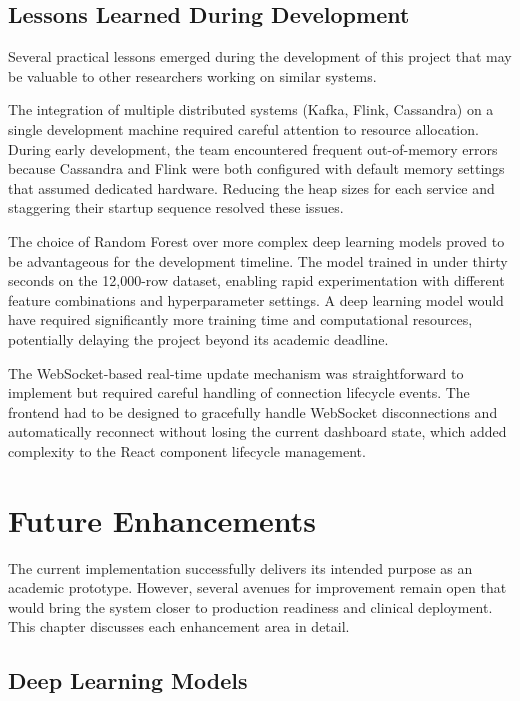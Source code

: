\documentclass[12pt, a4paper, oneside]{report}
\newcommand{\chapterpage}[2]{%
    \cleardoublepage
    \thispagestyle{empty}
    \vspace*{\fill}
    \begin{center}
        \huge \textbf{Chapter #1} \\
        \vspace{1cm}
        \Huge #2
    \end{center}
    \vspace*{\fill}
    \newpage
}
\begin{document}
\section{Lessons Learned During Development}

Several practical lessons emerged during the development of this project that may be valuable to other researchers working on similar systems.

The integration of multiple distributed systems (Kafka, Flink, Cassandra) on a single development machine required careful attention to resource allocation. During early development, the team encountered frequent out-of-memory errors because Cassandra and Flink were both configured with default memory settings that assumed dedicated hardware. Reducing the heap sizes for each service and staggering their startup sequence resolved these issues.

The choice of Random Forest over more complex deep learning models proved to be advantageous for the development timeline. The model trained in under thirty seconds on the 12,000-row dataset, enabling rapid experimentation with different feature combinations and hyperparameter settings. A deep learning model would have required significantly more training time and computational resources, potentially delaying the project beyond its academic deadline.

The WebSocket-based real-time update mechanism was straightforward to implement but required careful handling of connection lifecycle events. The frontend had to be designed to gracefully handle WebSocket disconnections and automatically reconnect without losing the current dashboard state, which added complexity to the React component lifecycle management.

\chapter{Future Enhancements}

The current implementation successfully delivers its intended purpose as an academic prototype. However, several avenues for improvement remain open that would bring the system closer to production readiness and clinical deployment. This chapter discusses each enhancement area in detail.

\section{Deep Learning Models}
\end{document}

